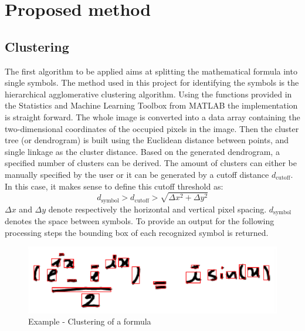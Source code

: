 \documentclass[twocolumn]{article}%
\begin{document}
	    
	\section{Proposed method}
	\subsection{Clustering}
		The first algorithm to be applied aims at splitting the mathematical formula into single symbols. The method used in this project for identifying the symbols is the hierarchical agglomerative clustering algorithm. Using the functions provided in the Statistics and Machine Learning Toolbox from MATLAB \cite{sml_matlab} the implementation is straight forward. The whole image is converted into a data array containing the two-dimensional coordinates of the occupied pixels in the image. Then the cluster tree (or dendrogram) is built using the Euclidean distance between points, and single linkage as the cluster distance. Based on the generated dendrogram, a specified number of clusters can be derived. The amount of clusters can either be manually specified by the user or it can be generated by a cutoff distance $d_{\text{cutoff}}$. In this case, it makes sense to define this cutoff threshold as:
		\begin{equation}
		d_{\text{symbol}} > d_{\text{cutoff}} > \sqrt{\Delta x^2 + \Delta y^2}
		\end{equation}
		$\Delta x$ and $\Delta y$ denote respectively the horizontal and vertical pixel spacing. $d_{\text{symbol}}$ denotes the space between symbols. To provide an output for the following processing steps the bounding box of each recognized symbol is returned.
		
	\begin{figure}[htp]
	\centering
	\includegraphics[scale=0.31]{images/cluster.png}
	\caption{Example - Clustering of a formula}
	\end{figure}
	
\end{document}
